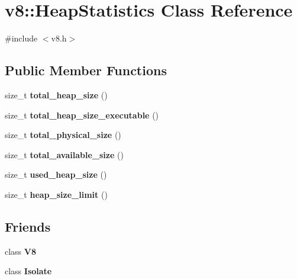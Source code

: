 \hypertarget{classv8_1_1HeapStatistics}{}\section{v8\+:\+:Heap\+Statistics Class Reference}
\label{classv8_1_1HeapStatistics}


{\ttfamily \#include $<$v8.\+h$>$}

\subsection*{Public Member Functions}
\begin{DoxyCompactItemize}
\item 
\hypertarget{classv8_1_1HeapStatistics_ac005b9c55d5818b6969c8fd61359139b}{}size\+\_\+t {\bfseries total\+\_\+heap\+\_\+size} ()\label{classv8_1_1HeapStatistics_ac005b9c55d5818b6969c8fd61359139b}

\item 
\hypertarget{classv8_1_1HeapStatistics_aa935ea51c12ec64049c06b532dbb4f8d}{}size\+\_\+t {\bfseries total\+\_\+heap\+\_\+size\+\_\+executable} ()\label{classv8_1_1HeapStatistics_aa935ea51c12ec64049c06b532dbb4f8d}

\item 
\hypertarget{classv8_1_1HeapStatistics_a084994a3a5edf15b73c9b171a911a487}{}size\+\_\+t {\bfseries total\+\_\+physical\+\_\+size} ()\label{classv8_1_1HeapStatistics_a084994a3a5edf15b73c9b171a911a487}

\item 
\hypertarget{classv8_1_1HeapStatistics_aa6df7f6e60766279cf4d8447a6d4d14d}{}size\+\_\+t {\bfseries total\+\_\+available\+\_\+size} ()\label{classv8_1_1HeapStatistics_aa6df7f6e60766279cf4d8447a6d4d14d}

\item 
\hypertarget{classv8_1_1HeapStatistics_a05ecb48bceea49d2fe430c81df02babc}{}size\+\_\+t {\bfseries used\+\_\+heap\+\_\+size} ()\label{classv8_1_1HeapStatistics_a05ecb48bceea49d2fe430c81df02babc}

\item 
\hypertarget{classv8_1_1HeapStatistics_a27e5a1ba9bc8530c6bf1cf277ce3d179}{}size\+\_\+t {\bfseries heap\+\_\+size\+\_\+limit} ()\label{classv8_1_1HeapStatistics_a27e5a1ba9bc8530c6bf1cf277ce3d179}

\end{DoxyCompactItemize}
\subsection*{Friends}
\begin{DoxyCompactItemize}
\item 
\hypertarget{classv8_1_1HeapStatistics_a51a1fbf409294cf02a99a020ac94a763}{}class {\bfseries V8}\label{classv8_1_1HeapStatistics_a51a1fbf409294cf02a99a020ac94a763}

\item 
\hypertarget{classv8_1_1HeapStatistics_aba4f0964bdacf2bbf62cf876e5d28d0a}{}class {\bfseries Isolate}\label{classv8_1_1HeapStatistics_aba4f0964bdacf2bbf62cf876e5d28d0a}

\end{DoxyCompactItemize}


